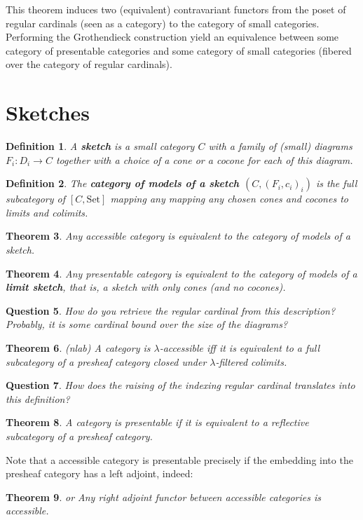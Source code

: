 \documentclass{article}
\newcommand{\Set}{\text{Set}}
\newtheorem{theorem}{Theorem}[section]
\newtheorem{definition}[theorem]{Definition}
\newtheorem{question}[theorem]{Question}
\begin{document}
This theorem induces two (equivalent) contravariant functors
from the poset of regular cardinals (seen
as a category) to the category of small categories. Performing the Grothendieck construction yield
an equivalence between some category of presentable categories and some category
of small categories (fibered over the
category of regular cardinals).
\section{Sketches}
\begin{definition}
 A \textbf{sketch} is a small category $C$ with a family of (small) diagrams $F_i : D_i
 \to C$ together with a choice of a cone or a cocone for each of this diagram.
\end{definition}
\begin{definition}
  The \textbf{category of models of a sketch $(C,(F_i,c_i)_i)$} is the full
  subcategory of $[C,\Set]$ mapping any mapping any chosen cones and cocones to
  limits and colimits.
\end{definition}
\begin{theorem}
 Any accessible category is equivalent to the category of models of a sketch.
\end{theorem}
\begin{theorem}
 Any presentable category is equivalent to the category of models of a
 \textbf{limit sketch}, that is, a sketch with only cones (and no cocones).
\end{theorem}
\begin{question}
 How do you retrieve the regular cardinal from this description? Probably, it is
some cardinal bound over the size of the diagrams?
\end{question}
\begin{theorem}
  (nlab)
 A  category is $\lambda$-accessible iff it is equivalent to a full subcategory
 of a presheaf category closed under $\lambda$-filtered colimits.
\end{theorem}
\begin{question}
  How does the raising of the indexing regular cardinal translates into this definition?
\end{question}
\begin{theorem}
 A category is presentable if it is equivalent to a reflective subcategory
 of a presheaf category.
\end{theorem}
Note that a accessible category is presentable
precisely if the embedding into the presheaf category has a left adjoint, indeed:
\begin{theorem}\cite[Proposition 2.4.8]{accessible} or \cite[2.23]{adamek_rosicky}
  Any right adjoint functor between accessible categories is accessible.
\end{theorem}
\end{document}
